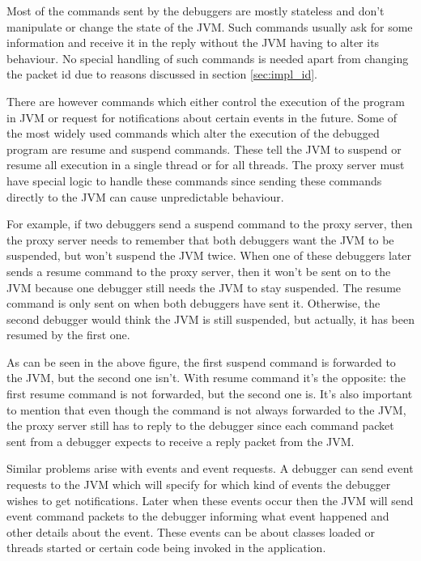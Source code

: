 \documentclass[..thesis.tex]{subfiles}
\begin{document}
Most of the commands sent by the debuggers are mostly stateless and don't manipulate or change the state of the JVM.
Such commands usually ask for some information and receive it in the reply without the JVM having to alter its behaviour.
No special handling of such commands is needed apart from changing the packet id due to reasons discussed in section \ref{sec:impl_id}.

There are however commands which either control the execution of the program in JVM or request for notifications about certain events in the future.
Some of the most widely used commands which alter the execution of the debugged program are resume and suspend commands.
These tell the JVM to suspend or resume all execution in a single thread or for all threads.
The proxy server must have special logic to handle these commands since sending these commands directly to the JVM can cause unpredictable behaviour.

For example, if two debuggers send a suspend command to the proxy server, then the proxy server needs to remember that both debuggers want the JVM to be suspended, but won't suspend the JVM twice.
When one of these debuggers later sends a resume command to the proxy server, then it won't be sent on to the JVM because one debugger still needs the JVM to stay suspended.
The resume command is only sent on when both debuggers have sent it.
Otherwise, the second debugger would think the JVM is still suspended, but actually, it has been resumed by the first one.



As can be seen in the above figure, the first suspend command is forwarded to the JVM, but the second one isn't. 
With resume command it's the opposite: the first resume command is not forwarded, but the second one is.
It's also important to mention that even though the command is not always forwarded to the JVM, the proxy server still has to reply to the debugger since each command packet sent from a debugger expects to receive a reply packet from the JVM.

Similar problems arise with events and event requests.
A debugger can send event requests to the JVM which will specify for which kind of events the debugger wishes to get notifications.
Later when these events occur then the JVM will send event command packets to the debugger informing what event happened and other details about the event.
These events can be about classes loaded or threads started or certain code being invoked in the application.
\end{document}
